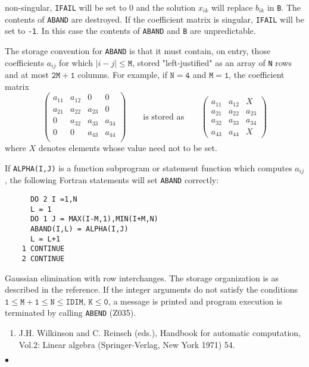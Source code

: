 non-singular, {\tt IFAIL} will be set to 0 and the solution $x_{ik}$ will
replace $b_{ik}$ in {\tt B}. The contents of {\tt ABAND} are destroyed.
If the coefficient matrix is singular, {\tt IFAIL} will be set
to {\tt -1}. In this case the contents of {\tt ABAND} and {\tt B} are
unpredictable.
\par
The storage convention for {\tt ABAND} is that it must contain, on
entry, those coefficients $a_{ij}$ for which $|i - j|\le \mathtt{M}$,
stored "left-justified" as an array of {\tt N} rows and at most
$\mathtt{2M+1}$ columns. For example, if $\mathtt{N=4}$ and
$\mathtt{M=1}$, the coefficient matrix
$$\left(\begin{array}{llll}
a_{11}& a_{12} & 0 &  0  \\
a_{21}& a_{22} & a_{23}& 0 \\
0     &a_{32}  & a_{33}&a_{34}\\
0     &0       & a_{43}&a_{44} \\
\end{array} \right)
\qquad \mbox{is stored as} \qquad
\left(\begin{array}{lll}
a_{11}& a_{12}& X\\
a_{21}& a_{22}& a_{23}\\
a_{32}& a_{33}& a_{34}\\
a_{43}& a_{44}& X
\end{array} \right) $$
where $X$ denotes elements whose value need not to be set.
\newpage
\par
If {\tt ALPHA(I,J)} is a function subprogram or statement function
which computes $a_{ij}$, the following Fortran statements will
set {\tt ABAND} correctly:
\begin{verbatim}
      DO 2 I =1,N
      L = 1
      DO 1 J = MAX(I-M,1),MIN(I+M,N)
      ABAND(I,L) = ALPHA(I,J)
      L = L+1
    1 CONTINUE
    2 CONTINUE
\end{verbatim}
\Method
Gaussian elimination with row interchanges. The storage organization is
as described in the reference.
\Errorh
If the integer arguments do not satisfy the conditions
$\mathtt{1 \leq M+1 \le  N \leq IDIM,\,K \le 0}$,
a message is printed and program execution is terminated by
calling {\tt ABEND} (Z035).
\Refer
\begin{enumerate}
\item J.H. Wilkinson and C. Reinsch (eds.), Handbook
for automatic computation, Vol.2: Linear algebra (Springer-Verlag,
New York 1971) 54.
\end{enumerate}
$\bullet$
